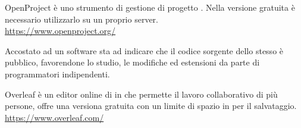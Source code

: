 OpenProject è uno strumento di gestione di progetto . Nella versione gratuita è necessario utilizzarlo su un proprio server.\\
\url{https://www.openproject.org/}

Accostato ad un software sta ad indicare che il codice sorgente dello stesso \`e pubblico, favorendone lo studio, le modifiche ed estensioni da parte di programmatori indipendenti.

Overleaf è un editor online di in  che permette il lavoro collaborativo di più persone, offre una versiona gratuita con un limite di spazio in  per il salvataggio.\\
\url{https://www.overleaf.com/}
\clearpage